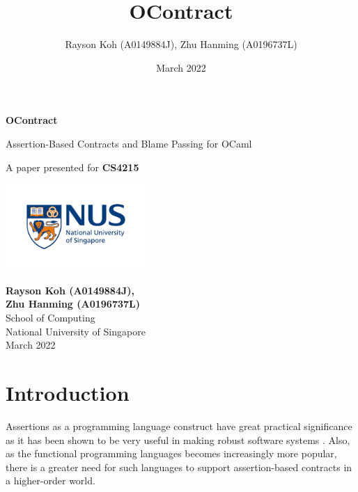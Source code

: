\documentclass[a4paper]{article}
\title{OContract}
\author{Rayson Koh (A0149884J), Zhu Hanming (A0196737L)}
\date{March 2022}
\begin{document}

\begin{titlepage}
    \begin{center}
        \vspace*{1cm}

        \Huge
        \textbf{OContract}

        \vspace{0.5cm}
        \LARGE
        Assertion-Based Contracts and Blame Passing for OCaml

        \vspace{1.5cm}


        \vfill

        A paper presented for \textbf{CS4215}

        \vspace{0.8cm}

        \includegraphics[width=0.4\textwidth]{nus-logo.jpg}

        \Large
        \textbf{Rayson Koh (A0149884J),\\Zhu Hanming (A0196737L)}\\
        School of Computing\\
        National University of Singapore\\
        March 2022

    \end{center}
\end{titlepage}

\tableofcontents
\newpage

\section{Introduction}

Assertions as a programming language construct have great practical significance as it has been shown to be very useful in making robust software systems \cite{rosen}.
Also, as the functional programming languages becomes increasingly more popular, there is a greater need for such languages to support assertion-based contracts in a higher-order world.
\end{document}

